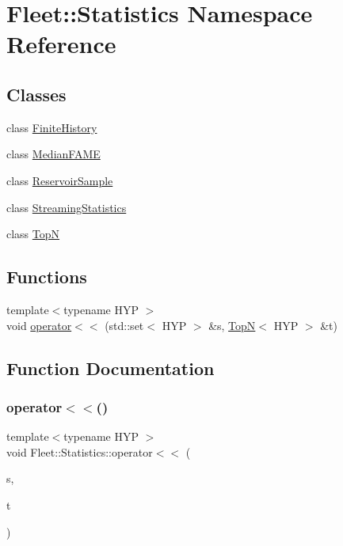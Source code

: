 \hypertarget{namespace_fleet_1_1_statistics}{}\section{Fleet\+:\+:Statistics Namespace Reference}
\label{namespace_fleet_1_1_statistics}
\subsection*{Classes}
\begin{DoxyCompactItemize}
\item 
class \hyperlink{class_fleet_1_1_statistics_1_1_finite_history}{Finite\+History}
\item 
class \hyperlink{class_fleet_1_1_statistics_1_1_median_f_a_m_e}{Median\+F\+A\+ME}
\item 
class \hyperlink{class_fleet_1_1_statistics_1_1_reservoir_sample}{Reservoir\+Sample}
\item 
class \hyperlink{class_fleet_1_1_statistics_1_1_streaming_statistics}{Streaming\+Statistics}
\item 
class \hyperlink{class_fleet_1_1_statistics_1_1_top_n}{TopN}
\end{DoxyCompactItemize}
\subsection*{Functions}
\begin{DoxyCompactItemize}
\item 
{\footnotesize template$<$typename H\+YP $>$ }\\void \hyperlink{namespace_fleet_1_1_statistics_a5723aae50d2da58a711e2e88af291dc8}{operator$<$$<$} (std\+::set$<$ H\+YP $>$ \&s, \hyperlink{class_fleet_1_1_statistics_1_1_top_n}{TopN}$<$ H\+YP $>$ \&t)
\end{DoxyCompactItemize}


\subsection{Function Documentation}
\mbox{\label{namespace_fleet_1_1_statistics_a5723aae50d2da58a711e2e88af291dc8}} 
\subsubsection{\texorpdfstring{operator$<$$<$()}{operator<<()}}
{\footnotesize\ttfamily template$<$typename H\+YP $>$ \\
void Fleet\+::\+Statistics\+::operator$<$$<$ (\begin{DoxyParamCaption}\item[{std\+::set$<$ H\+YP $>$ \&}]{s,  }\item[{\hyperlink{class_fleet_1_1_statistics_1_1_top_n}{TopN}$<$ H\+YP $>$ \&}]{t }\end{DoxyParamCaption})}

